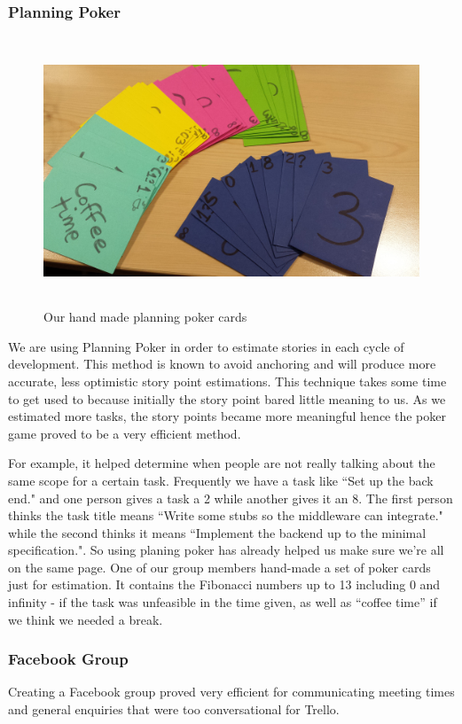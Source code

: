 \documentclass[11pt, a4paper]{article}
\begin{document}
\subsubsection{Planning Poker}
\begin{figure}[h!]
\centering
\includegraphics[height=80mm,width=130mm]{planningPokers.jpg}
\caption{Our hand made planning poker cards}
\end{figure}

We are using Planning Poker\cite{PlanningPoker} in order to estimate stories in each cycle of development.
This method is known to avoid anchoring and will produce more accurate, less optimistic story point estimations. This technique takes some time to get used to because initially the story point bared little meaning to us.
As we estimated more tasks, the story points became more meaningful hence the poker game proved to be a very efficient method.

For example, it helped determine when people are not really talking about the same scope for a certain task.
Frequently we have a task like ``Set up the back end." and one person gives a task a 2 while another gives it an 8.
The first person thinks the task title means ``Write some stubs so the middleware can integrate." while the second thinks it means ``Implement the backend up to the minimal specification.".
So using planing poker has already helped us make sure we're all on the same page.
One of our group members hand-made a set of poker cards just for estimation.
It contains the Fibonacci numbers up to 13 including 0 and infinity - if the task was unfeasible in the time given, as well as ``coffee time'' if we think we needed a break.

\subsubsection{Facebook Group}
Creating a Facebook group proved very efficient for communicating meeting times and general enquiries that were too conversational for Trello.
\end{document}
